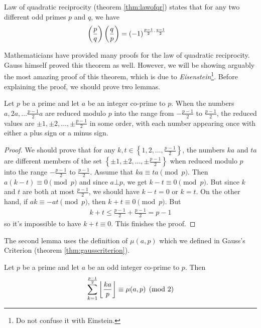 Law of quadratic reciprocity (theorem \eqref{thm:lawofqr}) states that for any two different odd primes $p$ and $q$, we have
\begin{align*}
	\left(\dfrac{p}{q}\right)\left(\dfrac{q}{p}\right)
		& =(-1)^{\frac{p-1}{2}\cdot \frac{q-1}{2}}
\end{align*}

Mathematicians have provided many proofs for the law of quadratic reciprocity. Gauss himself proved this theorem as well. However, we will be showing arguably the most amazing proof of this theorem, which is due to \textit{Eisenstein}\footnote{Do not confuse it with Einstein.}.
Before explaining the proof, we should prove two lemmas.

\begin{lemma}\label{lem:lawofqrlem1}
	Let $p$ be a prime and let $a$ be an integer co-prime to $p$. When the numbers $a, 2a, \ldots \frac{p-1}{2}a$ are reduced modulo $p$ into the range from $-\frac{p-1}{2}$ to $\frac{p-1}{2}$, the reduced values are $\pm 1, \pm 2, \dots, \pm \frac{p-1}{2}$ in some order, with each number appearing once with either a plus sign or a minus sign.
\end{lemma}

\begin{proof}\label{lem:lawofqrlem2}
	We should prove that for any $k, t \in \left\{1, 2, \dots, \frac{p-1}{2}\right\}$, the numbers $ka$ and $ta$ are different members of the set $\left\{ \pm 1, \pm 2, \dots, \pm \frac{p-1}{2} \right\}$ when reduced modulo $p$ into the range $-\frac{p-1}{2}$ to $\frac{p-1}{2}$. Assume that $ka \equiv ta \pmod p$. Then $a(k-t) \equiv 0 \pmod p$ and since $a \bot p$, we get $k-t \equiv 0 \pmod p$. But since $k$ and $t$ are both at most $\frac{p-1}{2}$, we should have $k-t=0$ or $k=t$. On the other hand, if $ak \equiv -at \pmod p$, then $k+t \equiv 0 \pmod p$. But
	\begin{align*}
	k+t \leq \frac{p-1}{2} + \frac{p-1}{2} = p-1
	\end{align*}
	so it's impossible to have $k+t \equiv 0$. This finishes the proof.
\end{proof}

The second lemma uses the definition of $\mu(a,p)$ which we defined in Gauss's Criterion (theorem \eqref{thm:gausscriterion}).

\begin{lemma}
	Let $p$ be a prime and let $a$ be an odd integer co-prime to $p$. Then
	\begin{align*}
		\sum_{k=1}^{\frac{p-1}{2}} \left\lfloor{\frac{ka}{p}}\right\rfloor\equiv \mu(a,p) \pmod 2
	\end{align*}
\end{lemma}

